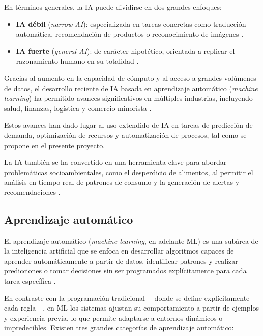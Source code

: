 En términos generales, la IA puede dividirse en dos grandes enfoques:

\begin{itemize}
    \item \textbf{IA débil} (\textit{narrow AI}): especializada en tareas concretas como traducción automática, recomendación de productos o reconocimiento de imágenes \parencite{russell2021}.
    
    \item \textbf{IA fuerte} (\textit{general AI}): de carácter hipotético, orientada a replicar el razonamiento humano en su totalidad \parencite{russell2021}.
\end{itemize}

Gracias al aumento en la capacidad de cómputo y al acceso a grandes volúmenes de datos, el desarrollo reciente de IA basada en aprendizaje automático (\textit{machine learning}) ha permitido avances significativos en múltiples industrias, incluyendo salud, finanzas, logística y comercio minorista \parencite{jordan2015}.

Estos avances han dado lugar al uso extendido de IA en tareas de predicción de demanda, optimización de recursos y automatización de procesos, tal como se propone en el presente proyecto.

La IA también se ha convertido en una herramienta clave para abordar problemáticas socioambientales, como el desperdicio de alimentos, al permitir el análisis en tiempo real de patrones de consumo y la generación de alertas y recomendaciones \parencite{rolnick2019}.

\subsection{Aprendizaje automático}

El aprendizaje automático (\textit{machine learning}, en adelante ML) es una subárea de la inteligencia artificial que se enfoca en desarrollar algoritmos capaces de aprender automáticamente a partir de datos, identificar patrones y realizar predicciones o tomar decisiones sin ser programados explícitamente para cada tarea específica \parencite{mitchell1997}.

En contraste con la programación tradicional —donde se define explícitamente cada regla—, en ML los sistemas ajustan su comportamiento a partir de ejemplos y experiencia previa, lo que permite adaptarse a entornos dinámicos o impredecibles. Existen tres grandes categorías de aprendizaje automático:

